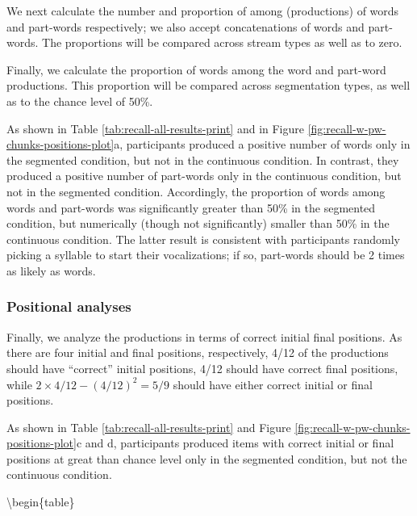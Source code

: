 \documentclass[]{article}
\begin{document}
We next calculate the number and proportion of among (productions) of
words and part-words respectively; we also accept concatenations of
words and part-words. The proportions will be compared across stream
types as well as to zero.

Finally, we calculate the proportion of words among the word and
part-word productions. This proportion will be compared across
segmentation types, as well as to the chance level of 50\%.

As shown in Table \ref{tab:recall-all-results-print} and in Figure
\ref{fig:recall-w-pw-chunks-positions-plot}a, participants produced a
positive number of words only in the segmented condition, but not in the
continuous condition. In contrast, they produced a positive number of
part-words only in the continuous condition, but not in the segmented
condition. Accordingly, the proportion of words among words and
part-words was significantly greater than 50\% in the segmented
condition, but numerically (though not significantly) smaller than 50\%
in the continuous condition. The latter result is consistent with
participants randomly picking a syllable to start their vocalizations;
if so, part-words should be 2 times as likely as words.

\subsubsection{Positional analyses}\label{positional-analyses}

Finally, we analyze the productions in terms of correct initial final
positions. As there are four initial and final positions, respectively,
4/12 of the productions should have ``correct'' initial positions, 4/12
should have correct final positions, while
\(2 \times 4/12 - (4/12)^2 = 5/9\) should have either correct initial or
final positions.

As shown in Table \ref{tab:recall-all-results-print} and Figure
\ref{fig:recall-w-pw-chunks-positions-plot}c and d, participants
produced items with correct initial or final positions at great than
chance level only in the segmented condition, but not the continuous
condition.

\textbackslash{}begin\{table\}
\end{document}
